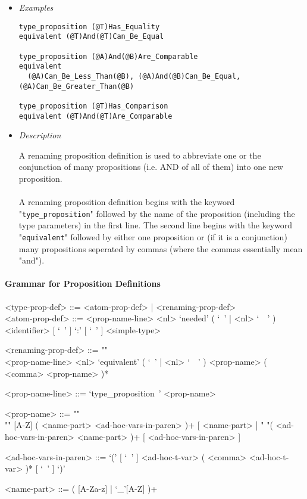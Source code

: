 \documentclass{article}
\begin{document}
\begin{itemize}
\item \textit{Examples}
\begin{verbatim}
type_proposition (@T)Has_Equality
equivalent (@T)And(@T)Can_Be_Equal

type_proposition (@A)And(@B)Are_Comparable
equivalent
  (@A)Can_Be_Less_Than(@B), (@A)And(@B)Can_Be_Equal, (@A)Can_Be_Greater_Than(@B)

type_proposition (@T)Has_Comparison
equivalent (@T)And(@T)Are_Comparable
\end{verbatim}

\item \textit{Description}

A renaming proposition definition is used to abbreviate one or the conjunction
of many propositions (i.e. AND of all of them) into one new proposition.
\\\\
A renaming proposition definition begins with the keyword
"\verb|type_proposition|" followed by the name of the proposition (including
the type parameters) in the first line. The second line begins with the keyword
"\verb|equivalent|" followed by either one proposition or (if it is a
conjunction) many propositions seperated by commas (where the commas
essentially mean "and").

\end{itemize}

\paragraph{Grammar for Proposition Definitions}

\begin{grammar}
<type-prop-def> ::= <atom-prop-def> | <renaming-prop-def>
\\

<atom-prop-def> ::=
<prop-name-line> <nl> `needed' ( `\ ' | <nl> `\ \ ' )
<identifier> [ `\ ' ] `:' [ `\ ' ] <simple-type>

<renaming-prop-def> ::= ""\\
<prop-name-line> <nl>
`equivalent' ( `\ ' | <nl> `\ \ ' ) <prop-name> ( <comma> <prop-name> )*

<prop-name-line> ::= `type_proposition\ ' <prop-name>

<prop-name> ::=  ""\\""
[A-Z] ( <name-part> <ad-hoc-vars-in-paren> )+ [ <name-part> ]
\alt " "( <ad-hoc-vars-in-paren> <name-part> )+ [ <ad-hoc-vars-in-paren> ]

<ad-hoc-vars-in-paren> ::=
`(' [ `\ ' ] <ad-hoc-t-var> ( <comma> <ad-hoc-t-var> )* [ `\ ' ] `)'

<name-part> ::= ( [A-Za-z] | `_'[A-Z] )+
\end{grammar} 
\end{document}
